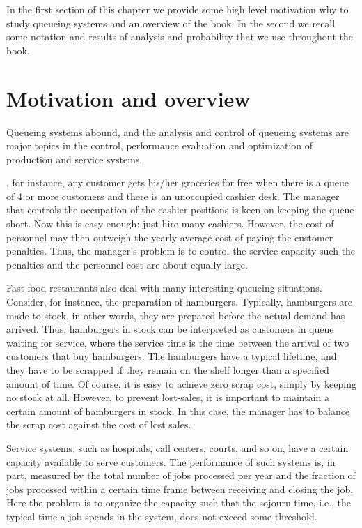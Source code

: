 \documentclass[queueing-book]{subfiles}
\begin{document}
In the first section of this chapter we provide some high level motivation why to study queueing systems and an overview of the book. In the second we recall some notation and results of analysis and probability that we use throughout the book.

\section{Motivation and overview}
\label{sec:motivation-overview}

Queueing systems abound, and the analysis and control of queueing systems are major topics in the control, performance evaluation and optimization of production and service systems.


, for instance, any customer gets his/her groceries for free when there is a queue of 4 or more customers and there is an unoccupied cashier desk.
The manager that controls the occupation of the cashier positions is keen on keeping the queue short.
Now this is easy enough: just hire many cashiers. However, the cost of personnel may then outweigh the yearly average cost of paying the customer penalties.
Thus, the manager's problem is to control the service capacity such the penalties and the personnel cost are about equally large.

Fast food restaurants also deal with many interesting queueing situations.
Consider, for instance, the preparation of hamburgers.
Typically, hamburgers are made-to-stock, in other words, they are prepared before the actual demand has arrived.
Thus, hamburgers in stock can be interpreted as customers in queue waiting for service, where the service time is the time between the arrival of two customers that buy hamburgers.
The hamburgers have a typical lifetime, and they have to be scrapped if they remain on the shelf longer than a specified amount of time.
Of course, it is easy to achieve zero scrap cost, simply by keeping no stock at all.
However, to prevent lost-sales, it is important to maintain a certain amount of hamburgers in stock.
In this case, the manager has to balance the scrap cost against the cost of lost sales.

Service systems, such as hospitals, call centers, courts, and so on, have a certain capacity available to serve customers.
The performance of such systems is, in part, measured by the total number of jobs processed per year and the fraction of jobs processed within a certain time frame between receiving and closing the job.
Here the problem is to organize the capacity such that the sojourn time, i.e., the typical time a job spends in the system, does not exceed some threshold.
\end{document}
